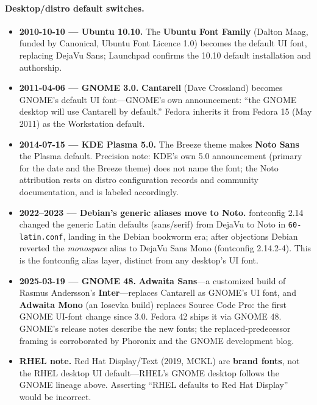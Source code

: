\documentclass[10pt,a4paper]{article}
\newcommand{\code}[1]{\texttt{#1}}
\begin{document}
\paragraph{Desktop/distro default switches.}
\begin{itemize}[leftmargin=1.2em,itemsep=2pt]
\item \textbf{2010-10-10 --- Ubuntu 10.10.} The \textbf{Ubuntu Font Family} (Dalton
Maag, funded by Canonical, Ubuntu Font Licence 1.0) becomes the default UI font,
replacing DejaVu Sans; Launchpad confirms the 10.10 default installation and
authorship.\cite{l-ubuntufont}
\item \textbf{2011-04-06 --- GNOME 3.0.} \textbf{Cantarell} (Dave Crossland) becomes
GNOME's default UI font---GNOME's own announcement: ``the GNOME desktop will use
Cantarell by default.'' Fedora inherits it from Fedora 15 (May 2011) as the Workstation
default.\cite{l-cantarell,l-cantarell-2}
\item \textbf{2014-07-15 --- KDE Plasma 5.0.} The Breeze theme makes \textbf{Noto Sans}
the Plasma default. Precision note: KDE's own 5.0 announcement (primary for the date
and the Breeze theme) does not name the font; the Noto attribution rests on distro
configuration records and community documentation, and is labeled
accordingly.\cite{l-plasma5}
\item \textbf{2022--2023 --- Debian's generic aliases move to Noto.} fontconfig 2.14
changed the generic Latin defaults (sans/serif) from DejaVu to Noto in
\code{60-latin.conf}, landing in the Debian bookworm era; after objections Debian
reverted the \emph{monospace} alias to DejaVu Sans Mono (fontconfig 2.14.2-4). This is
the fontconfig alias layer, distinct from any desktop's UI font.\cite{l-debian}
\item \textbf{2025-03-19 --- GNOME 48.} \textbf{Adwaita Sans}---a customized build of
Rasmus Andersson's \textbf{Inter}---replaces Cantarell as GNOME's UI font, and
\textbf{Adwaita Mono} (an Iosevka build) replaces Source Code Pro: the first GNOME
UI-font change since 3.0. Fedora 42 ships it via GNOME 48. GNOME's release notes
describe the new fonts; the replaced-predecessor framing is corroborated by Phoronix
and the GNOME development blog.\cite{l-gnome48,l-gnome48-2,l-gnome48-3}
\item \textbf{RHEL note.} Red Hat Display/Text (2019, MCKL) are \textbf{brand fonts},
not the RHEL desktop UI default---RHEL's GNOME desktop follows the GNOME lineage above.
Asserting ``RHEL defaults to Red Hat Display'' would be incorrect.\cite{l-redhat,l-redhat-2}
\end{itemize}
\end{document}
